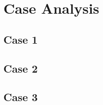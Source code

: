 \section{Case Analysis}
\label{sec:case_analysis}


\subsection{Case 1}

\subsection{Case 2}

\subsection{Case 3}

